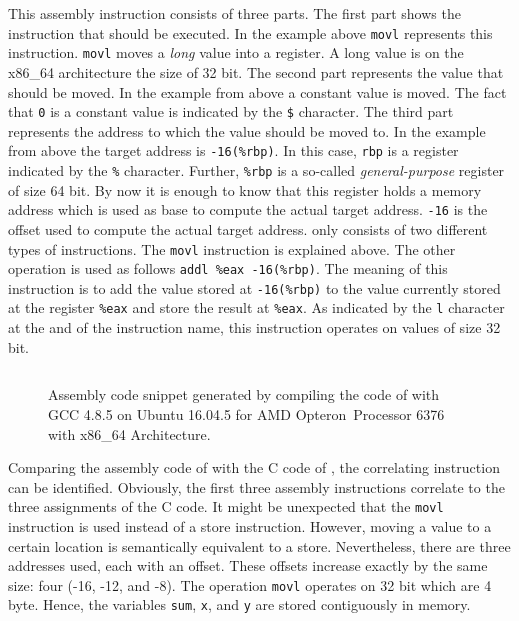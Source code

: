 \documentclass[onecolumn, openright, master, english, signatures]{dbrgrptt}
\begin{document}
This assembly instruction consists of three parts. The first part shows the instruction that should be executed. In the example above \texttt{movl} represents this instruction. \texttt{movl} moves a \emph{long} value into a register. A long value is on the x86\_64 architecture the size of 32 bit. The second part represents the value that should be moved. In the example from above a constant value is moved. The fact that \texttt{0} is a constant value is indicated by the \texttt{\$} character. The third part represents the address to which the value should be moved to. In the example from above the target address is \texttt{-16(\%rbp)}. In this case, \texttt{rbp} is a register indicated by the \texttt{\%} character. Further, \texttt{\%rbp} is a so-called \emph{general-purpose} register of size 64 bit. By now it is enough to know that this register holds a memory address which is used as base to compute the actual target address. \texttt{-16} is the offset used to compute the actual target address.
 only consists of two different types of instructions. The \texttt{movl} instruction is explained above. The other operation is used as follows \texttt{addl \%eax -16(\%rbp)}. The meaning of this instruction is to add the value stored at \texttt{-16(\%rbp)} to the value currently stored at the register \texttt{\%eax} and store the result at \texttt{\%eax}. As indicated by the \texttt{l} character at the and of the instruction name, this instruction operates on values of size 32 bit.

\begin{figure}[!ht]
  \centering
  \begin{tabular}{c}
  
  \end{tabular}
  \caption{Assembly code snippet generated by compiling the code of  with GCC 4.8.5 on Ubuntu 16.04.5 for AMD Opteron\texttrademark~Processor 6376 with x86\_64 Architecture.}
  \label{fig:mat-example-assembly-code}
\end{figure}

Comparing the assembly code of  with the C code of , the correlating instruction can be identified.
Obviously, the first three assembly instructions correlate to the three assignments of the C code.
It might be unexpected that the \texttt{movl} instruction is used instead of a store instruction.
However, moving a value to a certain location is semantically equivalent to a store.
Nevertheless, there are three addresses used, each with an offset.
These offsets increase exactly by the same size: four (-16, -12, and -8).
The operation \texttt{movl} operates on 32 bit which are 4 byte.
Hence, the variables \texttt{sum}, \texttt{x}, and \texttt{y} are stored contiguously in memory.
\end{document}
